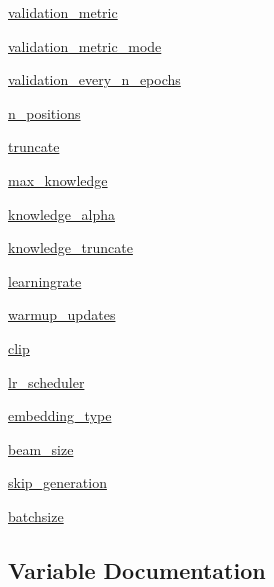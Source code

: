 \begin{DoxyCompactItemize}
\hyperlink{namespacegenerator_1_1train__end2end_adef91e8c853a5b7283844b1d8a00c4df}{validation\+\_\+metric}
\item 
\hyperlink{namespacegenerator_1_1train__end2end_a67b9ebbfe95b1d14872b55c7c9be4156}{validation\+\_\+metric\+\_\+mode}
\item 
\hyperlink{namespacegenerator_1_1train__end2end_a7e00456140e3a63ea14ba233a9e7a66a}{validation\+\_\+every\+\_\+n\+\_\+epochs}
\item 
\hyperlink{namespacegenerator_1_1train__end2end_a0551a01d7406f8cab8b6dc9c27cdc73e}{n\+\_\+positions}
\item 
\hyperlink{namespacegenerator_1_1train__end2end_ab88135039e089c9b5241ffd9064cd0fb}{truncate}
\item 
\hyperlink{namespacegenerator_1_1train__end2end_aa0cdac56e707271d336163095ed98ffc}{max\+\_\+knowledge}
\item 
\hyperlink{namespacegenerator_1_1train__end2end_a27067de980c69badd8fcb62e012f70c9}{knowledge\+\_\+alpha}
\item 
\hyperlink{namespacegenerator_1_1train__end2end_a26f75619ee937c21552e1a51fb674bcd}{knowledge\+\_\+truncate}
\item 
\hyperlink{namespacegenerator_1_1train__end2end_a60cf3214224ff0ef92637f93b26fdcd0}{learningrate}
\item 
\hyperlink{namespacegenerator_1_1train__end2end_a46f3ac2d5016297d480f98e579ca9b6d}{warmup\+\_\+updates}
\item 
\hyperlink{namespacegenerator_1_1train__end2end_a9dc6beaf71ac5004a98c731293f7ca07}{clip}
\item 
\hyperlink{namespacegenerator_1_1train__end2end_a5eafe4725241aa0585c2a6f21c9d5212}{lr\+\_\+scheduler}
\item 
\hyperlink{namespacegenerator_1_1train__end2end_a0aa0dd5e2a1abb6cdc96f5c564389d26}{embedding\+\_\+type}
\item 
\hyperlink{namespacegenerator_1_1train__end2end_a573047f559636b0a3fa95f91b096bf97}{beam\+\_\+size}
\item 
\hyperlink{namespacegenerator_1_1train__end2end_ad1acb717662f99dfe7ddf7f4111d4957}{skip\+\_\+generation}
\item 
\hyperlink{namespacegenerator_1_1train__end2end_a43258a19da4844a5353096d4201b004a}{batchsize}
\end{DoxyCompactItemize}


\subsection{Variable Documentation}
\mbox{\label{namespacegenerator_1_1train__end2end_a43258a19da4844a5353096d4201b004a}} 
